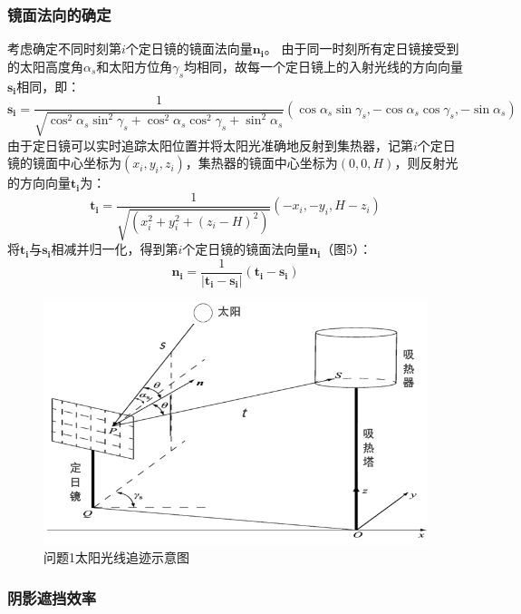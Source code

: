 \documentclass{article}
\numberwithin{equation}{subsection}
\begin{document}
\subsubsection{镜面法向的确定}
考虑确定不同时刻第$i$个定日镜的镜面法向量$\bm{n_i}$。
由于同一时刻所有定日镜接受到的太阳高度角$\alpha_s$和太阳方位角$\gamma_s$均相同，故每一个定日镜上的入射光线的方向向量$\bm{s_i}$相同，即：
\begin{equation}
    \bm{s_i}=\frac{1}{\sqrt{\cos^2 \alpha_s \sin^2 \gamma_s+\cos^2 \alpha_s \cos^2 \gamma_s+\sin^2 \alpha_s}}\left(
        \cos \alpha_s \sin \gamma_s ,
        -\cos \alpha_s \cos \gamma_s ,
        -\sin \alpha_s\right)
\end{equation}
由于定日镜可以实时追踪太阳位置并将太阳光准确地反射到集热器，记第$i$个定日镜的镜面中心坐标为$(x_i,y_i,z_i)$，集热器的镜面中心坐标为$(0,0,H)$，则反射光的方向向量$\bm{t_i}$为：
\begin{equation}
    \bm{t_i}=\frac{1}{\sqrt{(x_i^2+y_i^2+(z_i-H)^2)}}\left(
        -x_i,-y_i,H-z_i\right)
\end{equation}
将$\bm{t_i}$与$\bm{s_i}$相减并归一化，得到第$i$个定日镜的镜面法向量$\bm{n_i}$（图5）：
\begin{equation}
    \bm{n_i}=\frac{1}{|\bm{t_i}-\bm{s_i}|}\left(\bm{t_i}-\bm{s_i}\right)
\end{equation}
\begin{figure}[H]
    \centering
    \includegraphics[scale=0.45]{问题1-1光线反射示意图.png}
    \caption{问题1太阳光线追迹示意图}
\end{figure}

\subsubsection{阴影遮挡效率}
\end{document}
